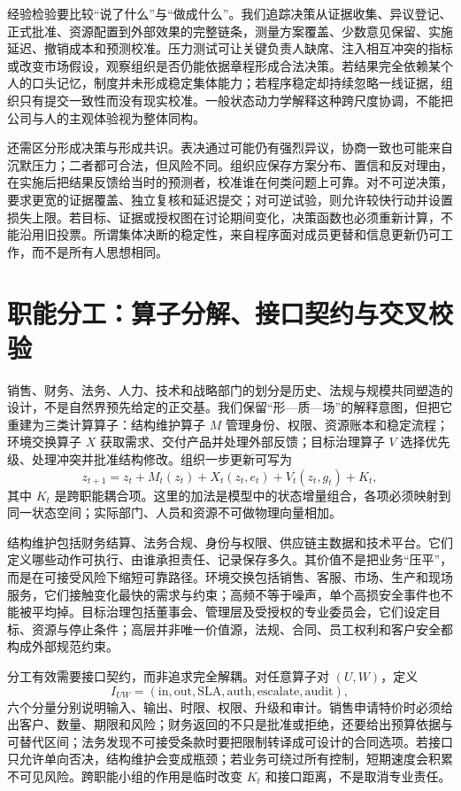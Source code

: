 经验检验要比较“说了什么”与“做成什么”。我们追踪决策从证据收集、异议登记、正式批准、资源配置到外部效果的完整链条，测量方案覆盖、少数意见保留、实施延迟、撤销成本和预测校准。压力测试可让关键负责人缺席、注入相互冲突的指标或改变市场假设，观察组织是否仍能依据章程形成合法决策。若结果完全依赖某个人的口头记忆，制度并未形成稳定集体能力；若程序稳定却持续忽略一线证据，组织只有提交一致性而没有现实校准。一般状态动力学解释这种跨尺度协调，不能把公司与人的主观体验视为整体同构。

还需区分形成决策与形成共识。表决通过可能仍有强烈异议，协商一致也可能来自沉默压力；二者都可合法，但风险不同。组织应保存方案分布、置信和反对理由，在实施后把结果反馈给当时的预测者，校准谁在何类问题上可靠。对不可逆决策，要求更宽的证据覆盖、独立复核和延迟提交；对可逆试验，则允许较快行动并设置损失上限。若目标、证据或授权图在讨论期间变化，决策函数也必须重新计算，不能沿用旧投票。所谓集体决断的稳定性，来自程序面对成员更替和信息更新仍可工作，而不是所有人思想相同。

\section{职能分工：算子分解、接口契约与交叉校验}
\label{sec:enterprise_topological_chemistry}

销售、财务、法务、人力、技术和战略部门的划分是历史、法规与规模共同塑造的设计，不是自然界预先给定的正交基。我们保留“形—质—场”的解释意图，但把它重建为三类计算算子：结构维护算子 $M$ 管理身份、权限、资源账本和稳定流程；环境交换算子 $X$ 获取需求、交付产品并处理外部反馈；目标治理算子 $V$ 选择优先级、处理冲突并批准结构修改。组织一步更新可写为
\begin{equation}
 z_{t+1}=z_t+M_t(z_t)+X_t(z_t,e_t)+V_t(z_t,g_t)+K_t,
\end{equation}
其中 $K_t$ 是跨职能耦合项。这里的加法是模型中的状态增量组合，各项必须映射到同一状态空间；实际部门、人员和资源不可做物理向量相加。

结构维护包括财务结算、法务合规、身份与权限、供应链主数据和技术平台。它们定义哪些动作可执行、由谁承担责任、记录保存多久。其价值不是把业务“压平”，而是在可接受风险下缩短可靠路径。环境交换包括销售、客服、市场、生产和现场服务，它们接触变化最快的需求与约束；高频不等于噪声，单个高损安全事件也不能被平均掉。目标治理包括董事会、管理层及受授权的专业委员会，它们设定目标、资源与停止条件；高层并非唯一价值源，法规、合同、员工权利和客户安全都构成外部规范约束。

分工有效需要接口契约，而非追求完全解耦。对任意算子对 $(U,W)$，定义
\begin{equation}
 I_{UW}=(\mathrm{in},\mathrm{out},\mathrm{SLA},\mathrm{auth},\mathrm{escalate},\mathrm{audit}),
\end{equation}
六个分量分别说明输入、输出、时限、权限、升级和审计。销售申请特价时必须给出客户、数量、期限和风险；财务返回的不只是批准或拒绝，还要给出预算依据与可替代区间；法务发现不可接受条款时要把限制转译成可设计的合同选项。若接口只允许单向否决，结构维护会变成瓶颈；若业务可绕过所有控制，短期速度会积累不可见风险。跨职能小组的作用是临时改变 $K_t$ 和接口距离，不是取消专业责任。

